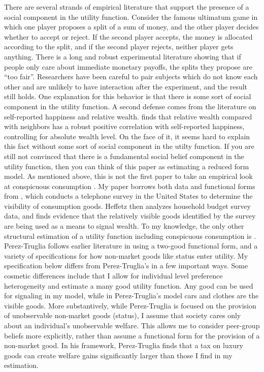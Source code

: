 There are several strands of empirical literature that support the presence of a social component in the utility function.  Consider the famous ultimatum game in which one player proposes a split of a sum of money, and the other player decides whether to accept or reject.  If the second player accepts, the money is allocated according to the split, and if the second player rejects, neither player gets anything.  There is a long and robust experimental literature showing that if people only care about immediate monetary payoffs, the splits they propose are ``too fair''.  Researchers have been careful to pair subjects which do not know each other and are unlikely to have interaction after the experiment, and the result still holds.  One explanation for this behavior is that there is some sort of social component in the utility function\citep{FehrSchmidt1999,BoltonOckenfels2000}.  A second defense comes from the literature on self-reported happiness and relative wealth.  \citet{Luttmer2004} finds that relative wealth compared with neighbors has a robust positive correlation  with self-reported happiness, controlling for absolute wealth level.  On the face of it, it seems hard to explain this fact without some sort of social component in the utilty function.  If you are still not convinced that there is a fundamental social belief component in the utility function, then you can think of this paper as estimating a reduced form model.
As mentioned above, this is not the first paper to take an empirical look at conspicuous consumption  \citep{Blochetal2004,Charlesetal2009,MoavNeeman2010,MoavNeeman2012}.  My paper borrows both data and functional forms from \citet{Heffetz2011}, which conducts a telephone survey in the United States to determine the visibility of consumption goods.  Heffetz then analyzes household budget survey data, and finds evidence that the relatively visible goods identified by the survey are being used as a means to signal wealth.  To my knowledge, the only other structural estimation of a utility function including conspicuous consumption is \citet{perez2013measuring}.  Perez-Truglia follows earlier literature in using a two-good functional form, and a variety of specifications for how non-market goods like status enter utility.  My specification below differs from Perez-Truglia's in a few important ways.  Some cosmetic differences include that I allow for individual level preference heterogeneity and estimate a many good utility function.  Any good can be used for signaling in my model, while in Perez-Truglia's model cars and clothes are the visible goods.  More substantively, while Perez-Truglia is focused on the provision of unobservable non-market goods (status), I assume that society cares only about an individual's unobservable welfare.  This allows me to consider peer-group beliefs more explicitly, rather than assume a functional form for the provision of a non-market good.  In his framework, Perez-Truglia finds that a tax on luxury goods can create welfare gains significantly larger than those I find in my estimation.

